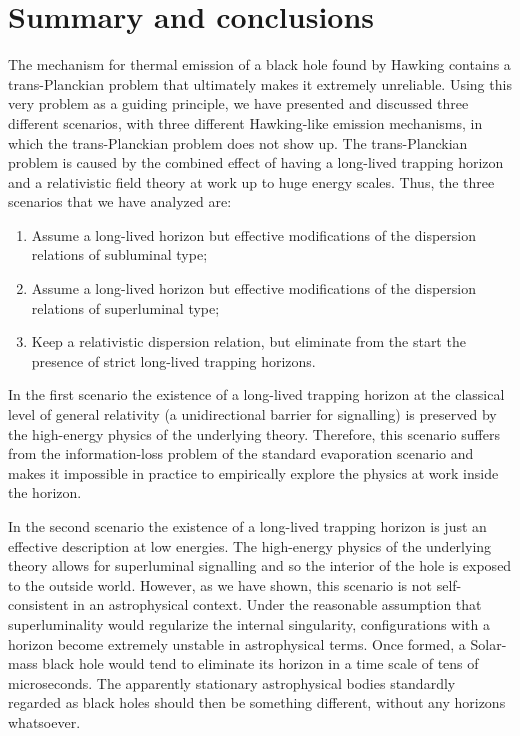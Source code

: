 \documentclass[11pt,a4paper]{article}
\begin{document}
\section{Summary and conclusions}
\label{Sec:Summary}

The mechanism for thermal emission of a black hole found by Hawking  
contains a trans-Planckian problem that ultimately makes it extremely unreliable.
Using this very problem as a guiding principle, we have  presented 
and discussed three different scenarios, with three different Hawking-like 
emission mechanisms, in which the trans-Planckian problem does not show up.
The trans-Planckian problem is caused by the combined effect of having
a long-lived trapping horizon and a relativistic field theory at work up 
to huge energy scales. Thus, the three scenarios that we have analyzed are:
\begin{enumerate}
\item
Assume a long-lived horizon but effective modifications of the dispersion
relations of subluminal type;
\item
Assume a long-lived horizon but effective modifications of the dispersion
relations of superluminal type;
\item
Keep a relativistic dispersion relation, but eliminate from the start the 
presence of strict long-lived trapping horizons.
\end{enumerate}

In the first scenario the existence of a long-lived trapping horizon 
at the classical level of general relativity (a unidirectional barrier for 
signalling) is preserved by the high-energy physics of the underlying theory.  
Therefore, this scenario suffers from the information-loss problem of the 
standard evaporation scenario and makes it impossible in practice to empirically
explore the physics at work inside the horizon. 

In the second scenario the existence of a long-lived trapping horizon 
is just an effective description at low energies. The high-energy physics of 
the underlying theory allows for superluminal signalling and so the interior of the
hole is exposed to the outside world. However, as we have shown, this scenario
is not self-consistent in an astrophysical context. Under the reasonable assumption that superluminality would regularize the internal
singularity, configurations with a horizon become extremely unstable in astrophysical terms. Once formed, a Solar-mass black hole would tend 
to eliminate its horizon in a time scale of tens of microseconds. The apparently 
stationary astrophysical bodies standardly regarded as black holes should then be 
something different, without any horizons whatsoever. 
\end{document}

